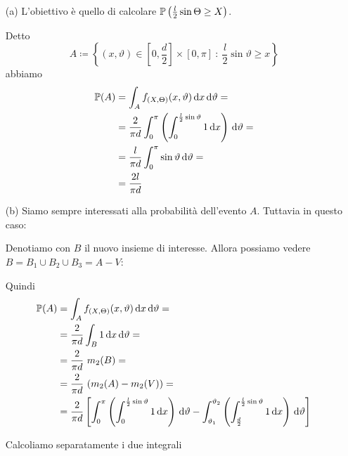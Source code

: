 \begin{enumerate}
\medskip

\begin{enumerate}

\item [(a)] L'obiettivo è quello di calcolare $\mathbb{P}\left(\frac{l}{2}\sin\Theta\geq X\right)$.

Detto 
\[
A\coloneqq\left\{(x,\vartheta)\in \left[0,\frac{d}{2}\right]\times \left[0,\pi\right]\ :\ \frac{l}{2}\sin\vartheta\geq x  \right\}
\]
abbiamo
\begin{gather*}
\begin{aligned}
\mathbb{P}(A)&=\int_A f_{(X,\Theta)}(x,\vartheta)\, \mathrm{d} x\, \mathrm{d} \vartheta=\\
&=\frac{2}{\pi d}\int_0^\pi \left(\int_0^{\frac{l}{2}\sin\vartheta}1\, \mathrm{d} x   \right)\, \mathrm{d} \vartheta=\\
&=\frac{l}{\pi d}\int_0^\pi \sin\vartheta\, \mathrm{d} \vartheta=\\
&=\frac{2l}{\pi d}
\end{aligned}
\end{gather*}

\item [(b)] Siamo sempre interessati alla probabilità dell'evento $A$. Tuttavia in questo caso:

Denotiamo con $B$ il nuovo insieme di interesse. Allora possiamo vedere $B=B_1\cup B_2\cup B_3=A-V$:

Quindi
\begin{gather}
\begin{aligned}
\label{eqn_7_8}
\mathbb{P}(A)&=\int_A f_{(X,\Theta)}(x,\vartheta)\, \mathrm{d} x\, \mathrm{d} \vartheta=\\
&=\frac{2}{\pi d}\int_B 1\, \mathrm{d} x\, \mathrm{d} \vartheta=\\
&=\frac{2}{\pi d}\ m_2(B)=\\
&=\frac{2}{\pi d}\ (m_2(A)-m_2(V))=\\
&=\frac{2}{\pi d}\left[\int_0^\pi \left(\int_0^{\frac{l}{2}\sin\vartheta}1\, \mathrm{d} x \right)\, \mathrm{d} \vartheta - \int_{\vartheta_1}^{\vartheta_2} \left(\int_{\frac{d}{2}}^{\frac{l}{2}\sin\vartheta}1\, \mathrm{d} x \right)\, \mathrm{d} \vartheta  \right]
\end{aligned}
\end{gather}

Calcoliamo separatamente i due integrali


\end{enumerate}
\end{enumerate}
